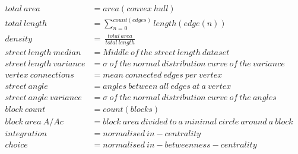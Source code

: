\begin{align}
    total\ area &= area(convex\ hull)  \\
    total\ length &= \sum_{n=0}^{count(edges)} length(edge(n))\  \\
    density &=\ \frac{total\ area}{total\ length} \\
    street\ length\ median &=  Middle\ of\ the\ street\ length\ dataset \\
    street\ length\ variance &= \sigma\ of\ the\ normal\ distribution\ curve\ of\ the\ variance \\
    vertex\ connections &= mean\ connected\ edges\ per\ vertex \\
    street\ angle &= angles\ between\ all\ edges\ at\ a\ vertex \\
    street\ angle\ variance &= \sigma\ of\ the\ normal\ distribution\ curve\ of\ the\ angles \\
    block\ count &= count(blocks) \\
    block\ area\ A/Ac &= block\ area\ divided\ to\ a\ minimal\ circle\ around\ a\ block \\
    integration &= normalised\ in-centrality \\
    choice &= normalised\ in-betweenness-centrality 
\end{align}
